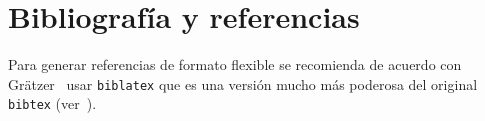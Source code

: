 \chapter{Bibliografía y referencias}
Para generar referencias de formato flexible se recomienda de acuerdo con Grätzer~\cite{gratzer} usar \texttt{biblatex} que es una versión mucho más poderosa del original \texttt{bibtex} (ver~\cite{lamport}).
